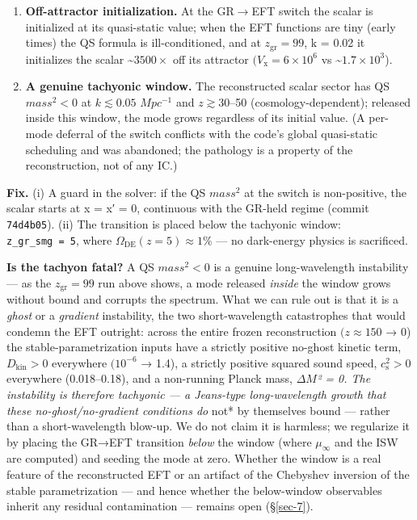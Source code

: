 \documentclass[preprint,12pt]{elsarticle}
\providecommand{\tightlist}{\setlength{\itemsep}{0pt}\setlength{\parskip}{0pt}}
\begin{document}
\begin{enumerate}
\def\labelenumi{\arabic{enumi}.}
\tightlist
\item
  \textbf{Off-attractor initialization.} At the GR\(\to\)EFT switch the
  scalar is initialized at its quasi-static value; when the EFT
  functions are tiny (early times) the QS formula is ill-conditioned,
  and at \(z_{\mathrm{gr}} = 99\), k = 0.02 it initializes the scalar
  \textasciitilde{}\(3500\times\) off its attractor
  \((V_{\mathrm{x}} = 6\times 10^{6}\) vs
  \textasciitilde{}\(1.7\times 10^{3}\)).
\item
  \textbf{A genuine tachyonic window.} The reconstructed scalar sector
  has QS \(mass^{2} < 0\) at \(k \lesssim  0.05\) \(Mpc^{-1}\) and
  \(z \gtrsim  30\)--50 (cosmology-dependent); released inside this
  window, the mode grows regardless of its initial value. (A per-mode
  deferral of the switch conflicts with the code's global quasi-static
  scheduling and was abandoned; the pathology is a property of the
  reconstruction, not of any IC.)
\end{enumerate}

\textbf{Fix.} (i) A guard in the solver: if the QS \(mass^{2}\) at the
switch is non-positive, the scalar starts at x = x′ = 0, continuous with
the GR-held regime (commit \texttt{74d4b05}). (ii) The transition is
placed below the tachyonic window: \texttt{z\_\allowbreak gr\_\allowbreak smg\ =\ 5}, where
\(\Omega _\mathrm{DE}(z=5) \approx  1\)\% --- no dark-energy physics is
sacrificed.

\textbf{Is the tachyon fatal?} A QS \(mass^{2} < 0\) is a genuine
long-wavelength instability --- as the \(z_{\mathrm{gr}} = 99\) run
above shows, a mode released \emph{inside} the window grows without
bound and corrupts the spectrum. What we can rule out is that it is a
\emph{ghost} or a \emph{gradient} instability, the two short-wavelength
catastrophes that would condemn the EFT outright: across the entire
frozen reconstruction \((z \approx  150\) → 0) the
stable-parametrization inputs have a strictly positive no-ghost kinetic
term, \(D_{\mathrm{kin}} > 0\) everywhere \((10^{-6}\) → 1.4), a
strictly positive squared sound speed, \(c_{\mathrm{s}}^{2} > 0\)
everywhere (0.018--0.18), and a non-running Planck mass,
\(\Delta M\)\emph{² = 0. The instability is therefore tachyonic --- a
Jeans-type long-wavelength growth that these no-ghost/no-gradient
conditions do }not* by themselves bound --- rather than a
short-wavelength blow-up. We do not claim it is harmless; we regularize
it by placing the GR→EFT transition \emph{below} the window (where
\(\mu _\infty\) and the ISW are computed) and seeding the mode at zero.
Whether the window is a real feature of the reconstructed EFT or an
artifact of the Chebyshev inversion of the stable parametrization ---
and hence whether the below-window observables inherit any residual
contamination --- remains open (§\ref{sec-7}).
\end{document}
